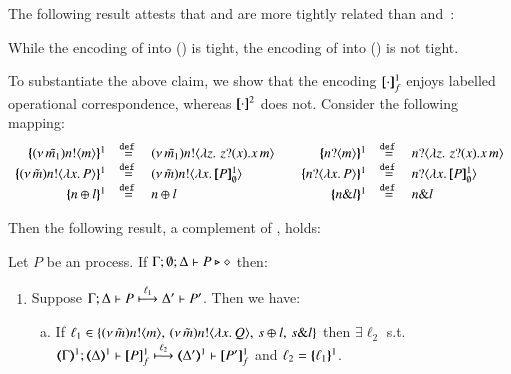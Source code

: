 \documentclass[runningheads]{llncs}
\begin{document}
{The following result attests that 
\HOp and \HO are more tightly related than \HOp and~\sessp:
\begin{theorem}\label{t:tight}
While the encoding of \HOp into \HO () is tight, the encoding of \HOp into \sessp () is not tight.
\end{theorem}

To substantiate the above claim, we show that the encoding $[\!\![\cdot]\!\!]^1_f$ enjoys 
labelled operational correspondence, whereas $[\!\![\cdot]\!\!]^2$ does not. 
Consider the following mapping:
\[
	\begin{array}{rclcrcl}
		\mapa{\news{\tilde{m_1}}\bactout{n}{m}}^{1}	&\defeq&	\news{\tilde{m_1}}\bactout{n}{\abs{z}{\,\binp{z}{x} \appl{x}{m}} }
		& &
		\mapa{\bactinp{n}{m}}^{1}			&\defeq&	\bactinp{n}{\abs{z}{\,\binp{z}{x} \appl{x}{m}} }
		\\
		\mapa{\news{\tilde{m}}\bactout{n}{\abs{x}{P}}}^{1} &\defeq& \news{\tilde{m}}\bactout{n}{\abs{x}{\pmapp{P}{1}{\es}}}
		& &
		\mapa{\bactinp{n}{\abs{x}{P}}}^{1} &\defeq& \bactinp{n}{\abs{x}{\pmapp{P}{1}{\es}}}
		\\
		\mapa{\bactsel{n}{l} }^{1} &\defeq& \bactsel{n}{l} 
		& &
		\mapa{\bactbra{n}{l} }^{1} &\defeq& \bactbra{n}{l} 
	\end{array}
\]



Then the following result, a complement of , holds:

\begin{proposition}
	\label{prop:lts_corr_HOp_to_HO}
	Let $P$ be an \HOp process.
	If $\Gamma; \emptyset; \Delta \vdash P \triangleright \diamond$ then:
%
	\begin{enumerate}[1.]
		\item
			Suppose $\Gamma; \Delta \vdash P \stackrel{\ell_1}{\longmapsto} \Delta' \vdash P'$. Then we have:
%
			\begin{enumerate}[a)]
				\item
					If $\ell_1 \in \{(\nu\, \tilde{m})n ! \langle m \rangle, \,(\nu\, \tilde{m})n ! \langle \lambda x.\,Q \rangle, \,s \oplus l, \,s \& l\}$
					then $\exists \ell_2$ s.t. \\
					$\horel{\tmap{\Gamma}{1}}{\tmap{\Delta}{1}}{\pmapp{P}{1}{f}}{\hby{\ell_2}}{\tmap{\Delta'}{1}}{\pmapp{P'}{1}{f}}$
					and $\ell_2 = \{\!\!\{\ell_1\}\!\!\}^{1}$.
			

\end{enumerate}
\end{enumerate}
\end{proposition}}
\end{document}
